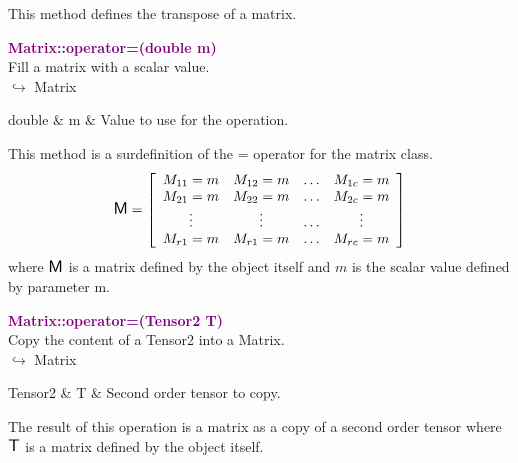 This method defines the transpose of a matrix.

\textcolor{purple}{\textbf{Matrix::operator=(double m)}}\label{Matrix::operator=(double m)}\\
Fill a matrix with a scalar value.\\ \hspace*{10mm}$\hookrightarrow$ Matrix

\begin{tcolorbox}[width=\textwidth,myArgs,tabularx={ll|R}]
double & m & Value to use for the operation.
\end{tcolorbox}

This method is a surdefinition of the = operator for the matrix class.
\begin{equation*}
\mbox{\large\ensuremath{\mathsf{M}}}=\left[\begin{array}{cccc}
  M_{11}=m & M_{12}=m & \hdots & M_{1c}=m\\
  M_{21}=m & M_{22}=m & \hdots & M_{2c}=m\\
  \vdots & \vdots & \hdots & \vdots\\
  M_{r1}=m & M_{r1}=m & \hdots & M_{rc}=m
  \end{array}\right]
\end{equation*}
where $\mbox{\large\ensuremath{\mathsf{M}}}$ is a matrix defined by the object itself and $m$ is the scalar value defined by parameter m.

\textcolor{purple}{\textbf{Matrix::operator=(Tensor2 T)}}\label{Matrix::operator=(Tensor2 T)}\\
Copy the content of a Tensor2 into a Matrix.\\ \hspace*{10mm}$\hookrightarrow$ Matrix

\begin{tcolorbox}[width=\textwidth,myArgs,tabularx={ll|R}]
Tensor2 & T & Second order tensor to copy.
\end{tcolorbox}

The result of this operation is a matrix as a copy of a second order tensor where $\mbox{\large\ensuremath{\mathsf{T}}}$ is a matrix defined by the object itself.

